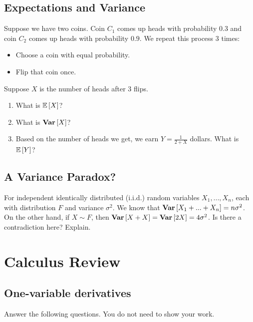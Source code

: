 \subsection{Expectations and Variance}

Suppose we have two coins. Coin $C_1$ comes up heads with probability $0.3$ and coin $C_2$ comes up heads with probability $0.9$. We repeat this process 3 times:
\begin{itemize}
    \item Choose a coin with equal probability. 
    \item Flip that coin once. 
\end{itemize}

Suppose $X$ is the number of heads after 3 flips.
\begin{enumerate}
    \item What is $\mathbb{E}\left[ X \right]$?
    \item What is $\textbf{Var}\left[ X \right]$?
    \item Based on the number of heads we get, we earn $Y = \frac{1}{2 + X}$ dollars. 
    What is $\mathbb{E}\left[ Y \right]$?
\end{enumerate}

\solution{}

\subsection{A Variance Paradox?}

For independent identically distributed (i.i.d.) random variables $X_1, ..., X_n$, each with distribution $F$ and variance $\sigma^2$.
We know that $\textbf{Var}\left[ X_1 + ... + X_n \right] = n\sigma^2$. 
On the other hand, if $X \sim F$, then $\textbf{Var}\left[ X + X \right] = \textbf{Var}\left[ 2X \right] = 4 \sigma^2$. Is there a contradiction here? Explain. 

\solution{}

\newpage

\section{Calculus Review }
 
\subsection{One-variable derivatives}

Answer the following questions. You do not need to show your work.

